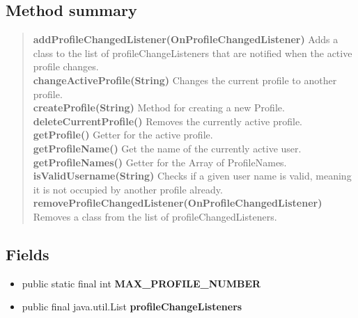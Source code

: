 \documentclass[11pt,a4paper]{report}
\begin{document}
{{{{{{{\subsection{Method summary}{
\begin{verse}
{\bf addProfileChangedListener(OnProfileChangedListener)} Adds a class to the list of profileChangeListeners that are notified when the active profile changes.\\
{\bf changeActiveProfile(String)} Changes the current profile to another profile.\\
{\bf createProfile(String)} Method for creating a new Profile.\\
{\bf deleteCurrentProfile()} Removes the currently active profile.\\
{\bf getProfile()} Getter for the active profile.\\
{\bf getProfileName()} Get the name of the currently active user.\\
{\bf getProfileNames()} Getter for the Array of ProfileNames.\\
{\bf isValidUsername(String)} Checks if a given user name is valid, meaning it is not occupied by another profile already.\\
{\bf removeProfileChangedListener(OnProfileChangedListener)} Removes a class from the list of profileChangedListeners.\\
\end{verse}
}
\subsection{Fields}{
\begin{itemize}
\item{
\label{com.retroMachines.game.controllers.ProfileController.MAX_PROFILE_NUMBER}public static final int {\bf  MAX\_PROFILE\_NUMBER}
}
\item{
\label{com.retroMachines.game.controllers.ProfileController.profileChangeListeners}public final java.util.List {\bf  profileChangeListeners}
}
\end{itemize}
}
}}}}}}}
\end{document}
